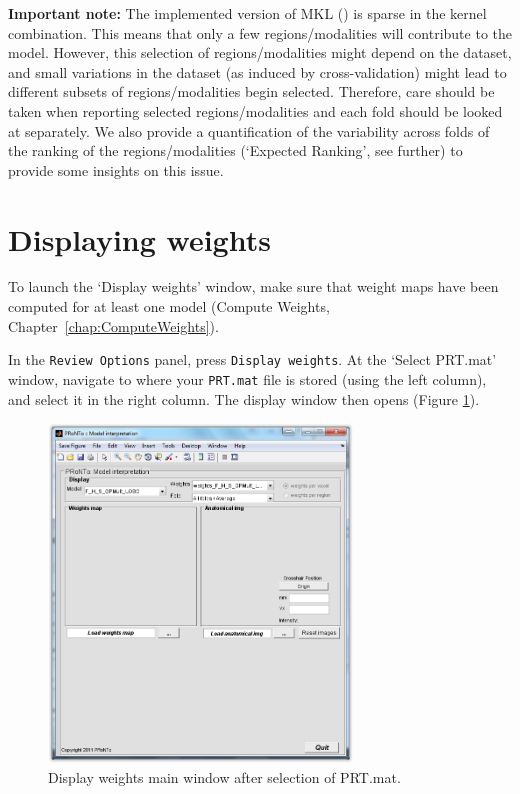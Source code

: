 \textbf{Important note:} The implemented version of MKL (\cite{Rakotomamonjy2008}) is sparse in the kernel combination. This means that only a few regions/modalities will contribute to the model. However, this selection of regions/modalities might depend on the dataset, and small variations in the dataset (as induced by cross-validation) might lead to different subsets of regions/modalities begin selected. Therefore, care should be taken when reporting selected regions/modalities and each fold should be looked at separately. We also provide a quantification of the variability across folds of the ranking of the regions/modalities (`Expected Ranking', see further) to provide some insights on this issue.


\section{Displaying weights}

To launch the `Display weights' window, make sure that weight maps have been computed for at least one model (Compute Weights, Chapter~\ref{chap:ComputeWeights}).

In the {\tt Review Options} panel, press {\tt Display weights}. At the `Select PRT.mat' window,
navigate to where your {\tt PRT.mat} file is stored (using the left column), and select it in the
right column. The display window then opens (Figure \ref{fig_prt_ui_weights_empty}).

\begin{figure}[h!]
\begin{center}
\includegraphics[height=9cm]{images/prt_ui_weights_empty.PNG}
\caption{Display weights main window after selection of PRT.mat.}
\label{fig_prt_ui_weights_empty}
\end{center}
\end{figure}


